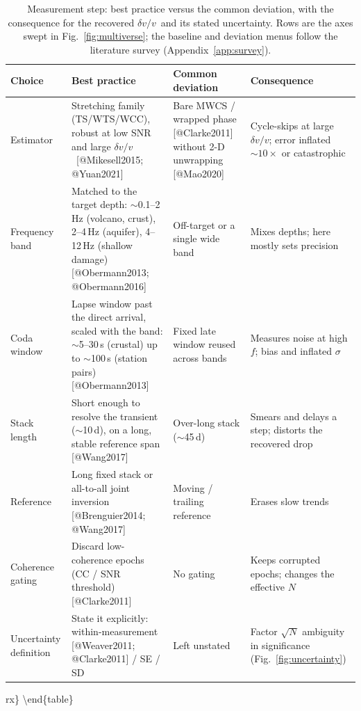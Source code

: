 \documentclass[
  11pt,
  letterpaper,
]{article}
\providecommand{\dvv}{\ensuremath{\delta v/v}}
\begin{document}
\begin{table}[htbp]
\footnotesize
\caption{Measurement step: best practice versus the common deviation, with the
consequence for the recovered \dvv\ and its stated uncertainty. Rows are the axes
swept in Fig.~\ref{fig:multiverse}; the baseline and deviation menus follow the
literature survey (Appendix~\ref{app:survey}).}
\label{tab:bp-measure}
\begin{tabularx}{\textwidth}{@{}>{\raggedright\arraybackslash}p{2.5cm} L L L@{}}
\toprule
\textbf{Choice} & \textbf{Best practice} & \textbf{Common deviation} &
\textbf{Consequence} \\
\midrule
Estimator & Stretching family (TS/WTS/WCC), robust at low SNR and large \dvv\
[@Mikesell2015; @Yuan2021] & Bare MWCS / wrapped phase [@Clarke2011] without 2-D
unwrapping [@Mao2020] & Cycle-skips at large \dvv; error inflated
$\sim\!10\times$ or catastrophic \\ \hline
Frequency band & Matched to the target depth: $\sim$0.1--2\,Hz (volcano, crust),
2--4\,Hz (aquifer), 4--12\,Hz (shallow damage) [@Obermann2013; @Obermann2016] &
Off-target or a single wide band & Mixes depths; here mostly sets precision \\ \hline
Coda window & Lapse window past the direct arrival, scaled with the band:
$\sim$5--30\,s (crustal) up to $\sim$100\,s (station pairs) [@Obermann2013] &
Fixed late window reused across bands & Measures noise at high $f$; bias and
inflated $\sigma$ \\ \hline
Stack length & Short enough to resolve the transient ($\sim$10\,d), on a long,
stable reference span [@Wang2017] & Over-long stack ($\sim$45\,d) & Smears and
delays a step; distorts the recovered drop \\ \hline
Reference & Long fixed stack or all-to-all joint inversion [@Brenguier2014;
@Wang2017] & Moving / trailing reference & Erases slow trends \\ \hline
Coherence gating & Discard low-coherence epochs (CC / SNR threshold)
[@Clarke2011] & No gating & Keeps corrupted epochs; changes the effective $N$ \\ \hline
Uncertainty definition & State it explicitly: within-measurement
[@Weaver2011; @Clarke2011] / SE / SD & Left unstated & Factor $\sqrt{N}$
ambiguity in significance (Fig.~\ref{fig:uncertainty}) \\
\bottomrule
\end{tabularx}
\end{table}

rx\} \textbackslash end\{table\}
\end{document}
